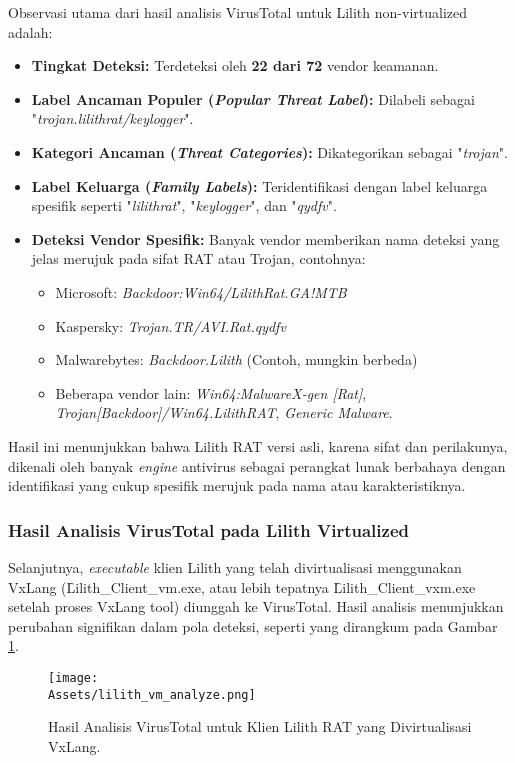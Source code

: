 Observasi utama dari hasil analisis VirusTotal untuk Lilith non-virtualized adalah:
\begin{itemize}
    \item \textbf{Tingkat Deteksi:} Terdeteksi oleh \textbf{22 dari 72} vendor keamanan.
    \item \textbf{Label Ancaman Populer (\textit{Popular Threat Label}):} Dilabeli sebagai "\textit{trojan.lilithrat/keylogger}".
    \item \textbf{Kategori Ancaman (\textit{Threat Categories}):} Dikategorikan sebagai "\textit{trojan}".
    \item \textbf{Label Keluarga (\textit{Family Labels}):} Teridentifikasi dengan label keluarga spesifik seperti "\textit{lilithrat}", "\textit{keylogger}", dan "\textit{qydfv}".
    \item \textbf{Deteksi Vendor Spesifik:} Banyak vendor memberikan nama deteksi yang jelas merujuk pada sifat RAT atau Trojan, contohnya:
        \begin{itemize}
            \item Microsoft: \textit{Backdoor:Win64/LilithRat.GA!MTB}
            \item Kaspersky: \textit{Trojan.TR/AVI.Rat.qydfv}
            \item Malwarebytes: \textit{Backdoor.Lilith} (Contoh, mungkin berbeda)
            \item Beberapa vendor lain: \textit{Win64:MalwareX-gen [Rat]}, \textit{Trojan[Backdoor]/Win64.LilithRAT}, \textit{Generic Malware}.
        \end{itemize}
\end{itemize}
Hasil ini menunjukkan bahwa Lilith RAT versi asli, karena sifat dan perilakunya, dikenali oleh banyak \textit{engine} antivirus sebagai perangkat lunak berbahaya dengan identifikasi yang cukup spesifik merujuk pada nama atau karakteristiknya.

\subsubsection{Hasil Analisis VirusTotal pada Lilith Virtualized}
Selanjutnya, \textit{executable} klien Lilith yang telah divirtualisasi menggunakan VxLang (\f{Lilith\_Client\_vm.exe}, atau lebih tepatnya \f{Lilith\_Client\_vxm.exe} setelah proses VxLang tool) diunggah ke VirusTotal. Hasil analisis menunjukkan perubahan signifikan dalam pola deteksi, seperti yang dirangkum pada Gambar \ref{fig:virustotal_lilith_vm_bab5}.

\begin{figure}[H] %
    \centering
    \texttt{[image: \\Assets/lilith\_vm\_analyze.png]} %
    \caption{Hasil Analisis VirusTotal untuk Klien Lilith RAT yang Divirtualisasi VxLang.}
    \label{fig:virustotal_lilith_vm_bab5}
\end{figure}

